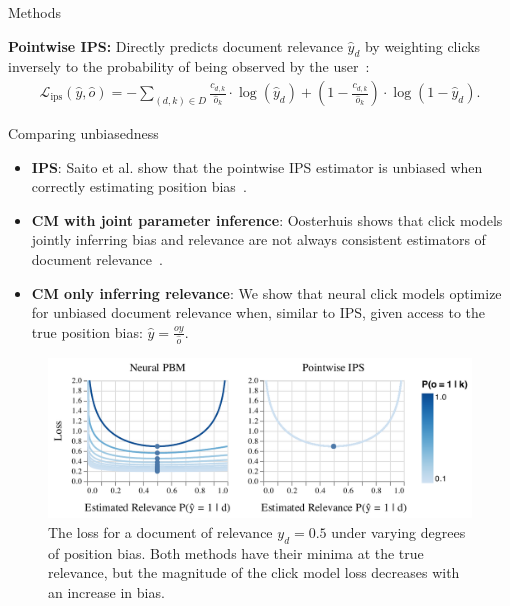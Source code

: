 \documentclass[final]{beamer}
\newlength{\onecolwid}
\begin{document}
\begin{frame}[t]
\begin{columns}[t]
\begin{column}{\onecolwid}
\begin{block}{Methods}
		\vspace{1ex}
		
		\textbf{Pointwise IPS:} Directly predicts document relevance $\hat{y}_d$ by weighting clicks inversely to the probability of being observed by the user~\cite{Saito2020PointwiseIPS}:
		\vspace{1ex}
		\begin{equation*}
			\begin{split}
			\mathcal{L}_{\text{ips}}(\hat{y}, \hat{o}) = - \sum_{(d,k) \in D} \frac{c_{d,k}}{\hat{o}_k} \cdot \log(\hat{y}_{d}) + (1 - \frac{c_{d,k}}{\hat{o}_k}) \cdot \log(1 - \hat{y}_{d}).
			\end{split}
		\end{equation*}

	\end{block}

	\vspace{1ex}
	
	\begin{alertblock}{Comparing unbiasedness}
		\vspace{1ex}

		\begin{itemize}
			\item \textbf{IPS}: Saito et al. show that the pointwise IPS estimator is unbiased when correctly estimating position bias~\cite{Saito2020PointwiseIPS}.
			\item \textbf{CM with joint parameter inference}: Oosterhuis shows that click models jointly inferring bias and relevance are not always consistent estimators of document relevance~\cite{Oosterhuis2022ULTRLimits}.
			\item \textbf{CM only inferring relevance}: \alert{We show that neural click models optimize for unbiased document relevance when, similar to IPS, given access to the true position bias}: $\hat{y} = \frac{o y}{\hat{o}}$.
		\end{itemize}

		\vspace{1ex}

		\begin{figure}[h]
			\includegraphics[width=1.\textwidth]{loss.pdf}
			\caption{The loss for a document of relevance $y_d = 0.5$ under varying degrees of position bias. Both methods have their minima at the true relevance, but the magnitude of the click model loss decreases with an increase in bias.}
		\end{figure}


\end{alertblock}
\end{column}
\end{columns}
\end{frame}
\end{document}
